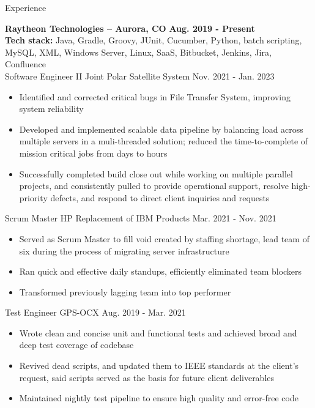 \documentclass[12pt]{resumeclass}
\begin{document}
\resumesect
    {Experience}
    {\textbf{\large{Raytheon Technologies -- Aurora, CO}} \hfill \textbf{Aug. 2019 - Present}
    \vspace{2pt}\\
    \textbf{Tech stack:} Java, Gradle, Groovy, JUnit, Cucumber, Python, batch scripting, MySQL, XML,
    Windows Server, Linux, SaaS, Bitbucket, Jenkins, Jira, Confluence
    \vspace{2pt}\\
    \experiencesect
	{Software Engineer II}
	{Joint Polar Satellite System}
	{Nov. 2021 - Jan. 2023}
	{\begin{itemize}[noitemsep,nolistsep]
	    \item Identified and corrected critical bugs in File Transfer
	    System, improving system reliability 
	    \item Developed and implemented scalable data pipeline by balancing
	    load across multiple servers in a muli-threaded solution; reduced
	    the time-to-complete of mission critical jobs from days to hours
	    \item Successfully completed build close out while working on
	    multiple parallel projects, and consistently pulled to provide
	    operational support, resolve high-priority defects, and respond to
	    direct client inquiries and requests
	\end{itemize}}
    \vspace{2pt}
    \experiencesect
	{Scrum Master}
	{HP Replacement of IBM Products}
	{Mar. 2021 - Nov. 2021}
	{\begin{itemize}[noitemsep,nolistsep]
	    \item Served as Scrum Master to fill void created by staffing
	    shortage, lead team of six during the process of migrating server
	    infrastructure
	    \item Ran quick and effective daily standups, efficiently eliminated
	    team blockers
	    \item Transformed previously lagging team into top performer
	\end{itemize}}
    \vspace{2pt}
    \experiencesect
	{Test Engineer}
	{GPS-OCX}
	{Aug. 2019 - Mar. 2021}
	{\begin{itemize}[noitemsep,nolistsep]
	    \item Wrote clean and concise unit and functional tests and achieved
	    broad and deep test coverage of codebase
	    \item Revived dead scripts, and updated them to IEEE standards at
	    the client's request, said scripts served as the basis for future
	    client deliverables
	    \item Maintained nightly test pipeline to ensure high quality and
	    error-free code
	\end{itemize}}}
\end{document}
